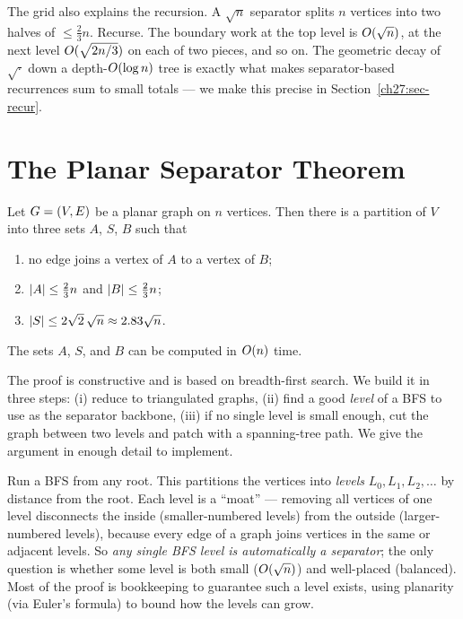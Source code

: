 The grid also explains the recursion. A $\sqrt n$ separator splits $n$ vertices into two halves of $\le \tfrac23 n$. Recurse. The boundary work at the top level is $O(\sqrt n)$, at the next level $O(\sqrt{2n/3})$ on each of two pieces, and so on. The geometric decay of $\sqrt{\cdot}$ down a depth-$O(\log n)$ tree is exactly what makes separator-based recurrences sum to small totals --- we make this precise in Section~\ref{ch27:sec-recur}.

\section{The Planar Separator Theorem}

\begin{theorem}\label{ch27:thm-lt}
Let $G=(V,E)$ be a planar graph on $n$ vertices. Then there is a partition of $V$ into three sets $A$, $S$, $B$ such that
\begin{enumerate}
  \item no edge joins a vertex of $A$ to a vertex of $B$;
  \item $\lvert A\rvert\le \tfrac23 n$ and $\lvert B\rvert\le \tfrac23 n$;
  \item $\lvert S\rvert \le 2\sqrt 2\,\sqrt n \approx 2.83\sqrt n$.
\end{enumerate}
The sets $A$, $S$, and $B$ can be computed in $O(n)$ time.
\end{theorem}

The proof is constructive and is based on breadth-first search. We build it in three steps: (i) reduce to triangulated graphs, (ii) find a good \emph{level} of a BFS to use as the separator backbone, (iii) if no single level is small enough, cut the graph between two levels and patch with a spanning-tree path. We give the argument in enough detail to implement.

\begin{intuitionbox}
Run a BFS from any root. This partitions the vertices into \emph{levels} $L_0,L_1,L_2,\dots$ by distance from the root. Each level is a ``moat'' --- removing all vertices of one level disconnects the inside (smaller-numbered levels) from the outside (larger-numbered levels), because every edge of a graph joins vertices in the same or adjacent levels. So \emph{any single BFS level is automatically a separator}; the only question is whether some level is both small ($O(\sqrt n)$) and well-placed (balanced). Most of the proof is bookkeeping to guarantee such a level exists, using planarity (via Euler's formula) to bound how the levels can grow.
\end{intuitionbox}


